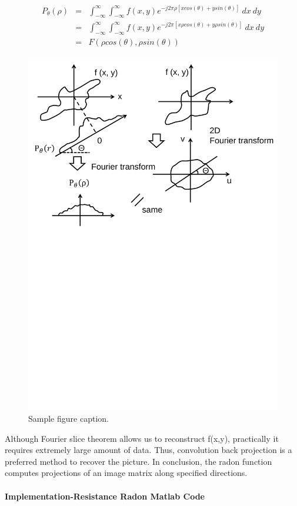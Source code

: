 \documentclass{article}
\begin{document}
\begin{eqnarray}    \label{eq4}
	P_{\theta}(\rho)&=&\int_{-\infty}^{\infty}\int_{-\infty}^{\infty}f(x,y)e^{-j2\pi\rho[xcos(\theta)+ysin(\theta)]}\ dx\ dy \nonumber    \\
	~&=&\int_{-\infty}^{\infty}\int_{-\infty}^{\infty}f(x,y)e^{-j2\pi[x\rho cos(\theta)+y\rho sin(\theta)]}\ dx\ dy \nonumber    \\
	~&=&F(\rho cos(\theta),\rho sin(\theta))
\end{eqnarray}

\begin{figure}
	\centering
	\includegraphics[width=0.7\linewidth]{p1.pdf}
	\caption{Sample figure caption.}
	\label{fig:p1svg}
\end{figure}

Although Fourier slice theorem allows us to reconstruct f(x,y),  practically it requires extremely large amount of data. Thus, convolution back projection is a preferred method to recover the picture. In conclusion, the radon function computes projections of an image matrix along specified directions.\citep{mathworksRadonTransform}

\paragraph{Implementation-Resistance Radon Matlab Code}
\end{document}
